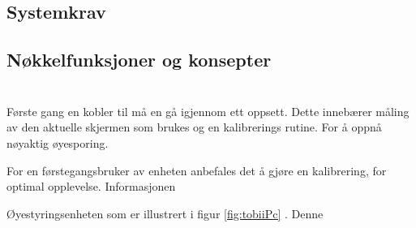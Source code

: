 \documentclass[phd,tocprelim]{cornell}
\begin{document}


\subsection{Systemkrav}

\subsection{Nøkkelfunksjoner og konsepter}

\section{}

Første gang en kobler til må en gå igjennom ett oppsett. Dette innebærer måling av den aktuelle skjermen som brukes og en kalibrerings rutine. For å oppnå nøyaktig øyesporing.  

For en førstegangsbruker av enheten anbefales det å gjøre en kalibrering, for optimal opplevelse. Informasjonen


Øyestyringsenheten som er illustrert i figur \ref{fig:tobiiPc}  . Denne




\medskip


\end{document}

